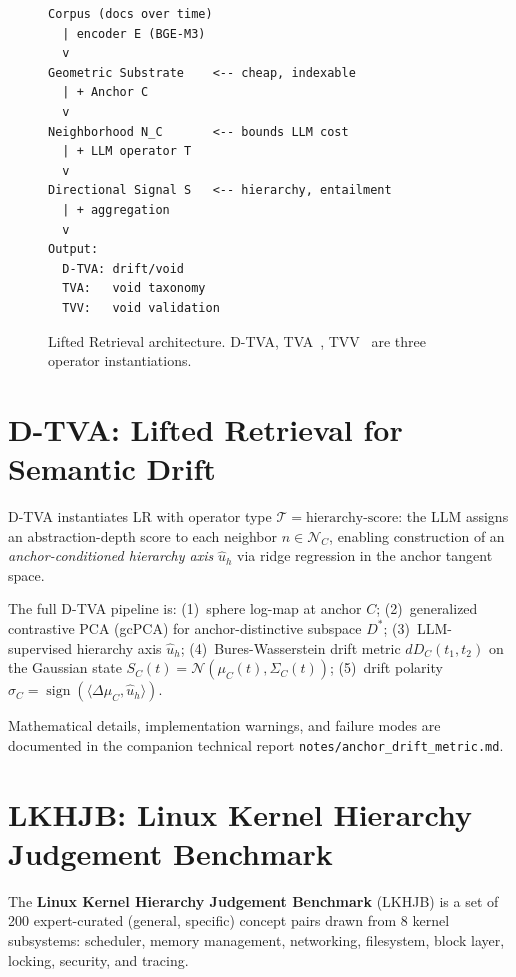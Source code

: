 \documentclass[twocolumn]{article}
\newcommand{\dtva}{\textsc{D-TVA}}
\newcommand{\tva}{\textsc{TVA}}
\newcommand{\tvv}{\textsc{TVV}}
\newcommand{\lr}{\textsc{LR}}
\begin{document}
\begin{figure}[t]
\centering
\footnotesize
\begin{verbatim}
Corpus (docs over time)
  | encoder E (BGE-M3)
  v
Geometric Substrate    <-- cheap, indexable
  | + Anchor C
  v
Neighborhood N_C       <-- bounds LLM cost
  | + LLM operator T
  v
Directional Signal S   <-- hierarchy, entailment
  | + aggregation
  v
Output:
  D-TVA: drift/void
  TVA:   void taxonomy
  TVV:   void validation
\end{verbatim}
\caption{Lifted Retrieval architecture.
\dtva{}, \tva{}~\cite{pan2026tva}, \tvv{}~\cite{pan2026tvv}
are three operator instantiations.}
\label{fig:lr-arch}
\end{figure}

\section{D-TVA: Lifted Retrieval for Semantic Drift}
\label{sec:dtva}

\dtva{} instantiates \lr{} with operator type
$\mathcal{T} = \text{hierarchy-score}$:
the LLM assigns an abstraction-depth score to each neighbor
$n \in \mathcal{N}_C$, enabling construction of an
\emph{anchor-conditioned hierarchy axis} $\hat{u}_h$ via ridge
regression in the anchor tangent space.

The full D-TVA pipeline is:
(1)~sphere log-map at anchor $C$;
(2)~generalized contrastive PCA (gcPCA) for anchor-distinctive
subspace $D^*$;
(3)~LLM-supervised hierarchy axis $\hat{u}_h$;
(4)~Bures-Wasserstein drift metric $dD_C(t_1,t_2)$ on the
Gaussian state $S_C(t) = \mathcal{N}(\mu_C(t), \Sigma_C(t))$;
(5)~drift polarity $\sigma_C = \operatorname{sign}(\langle
\Delta\mu_C, \hat{u}_h \rangle)$.

Mathematical details, implementation warnings, and failure modes
are documented in the companion technical report
\texttt{notes/anchor\_drift\_metric.md}.

\section{LKHJB: Linux Kernel Hierarchy Judgement Benchmark}
\label{sec:lkhjb}

The \textbf{Linux Kernel Hierarchy Judgement Benchmark} (LKHJB) is a
set of 200 expert-curated (general, specific) concept pairs drawn from
8 kernel subsystems: scheduler, memory management, networking,
filesystem, block layer, locking, security, and tracing.
\end{document}
